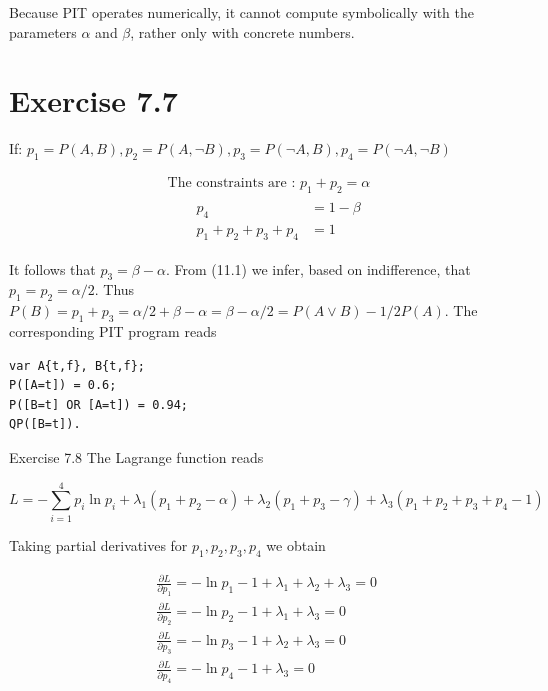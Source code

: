 \documentclass[10pt]{book}
\begin{document}
Because PIT operates numerically, it cannot compute symbolically with the parameters $\alpha$ and $\beta$, rather only with concrete numbers.

\section{Exercise 7.7}
If: $p_{1}=P(A, B), p_{2}=P(A, \neg B), p_{3}=P(\neg A, B), p_{4}=P(\neg A, \neg B)$

\begin{align*}
& \text { The constraints are : } p_{1}+p_{2}=\alpha  \tag{11.1}\\
& \qquad \begin{aligned}
p_{4} & =1-\beta \\
p_{1}+p_{2}+p_{3}+p_{4} & =1
\end{aligned} \tag{11.2}
\end{align*}

It follows that $p_{3}=\beta-\alpha$. From (11.1) we infer, based on indifference, that $p_{1}=p_{2}=\alpha / 2$. Thus $P(B)=p_{1}+p_{3}=\alpha / 2+\beta-\alpha=\beta-\alpha / 2=P(A \vee B)-1 / 2 P(A)$. The corresponding PIT program reads

\begin{verbatim}
var A{t,f}, B{t,f};
P([A=t]) = 0.6;
P([B=t] OR [A=t]) = 0.94;
QP([B=t]).
\end{verbatim}

Exercise 7.8 The Lagrange function reads

\begin{equation*}
L=-\sum_{i=1}^{4} p_{i} \ln p_{i}+\lambda_{1}\left(p_{1}+p_{2}-\alpha\right)+\lambda_{2}\left(p_{1}+p_{3}-\gamma\right)+\lambda_{3}\left(p_{1}+p_{2}+p_{3}+p_{4}-1\right) \tag{11.4}
\end{equation*}

Taking partial derivatives for $p_{1}, p_{2}, p_{3}, p_{4}$ we obtain

\begin{align*}
& \frac{\partial L}{\partial p_{1}}=-\ln p_{1}-1+\lambda_{1}+\lambda_{2}+\lambda_{3}=0  \tag{11.5}\\
& \frac{\partial L}{\partial p_{2}}=-\ln p_{2}-1+\lambda_{1}+\lambda_{3}=0  \tag{11.6}\\
& \frac{\partial L}{\partial p_{3}}=-\ln p_{3}-1+\lambda_{2}+\lambda_{3}=0  \tag{11.7}\\
& \frac{\partial L}{\partial p_{4}}=-\ln p_{4}-1+\lambda_{3}=0 \tag{11.8}
\end{align*}
\end{document}
